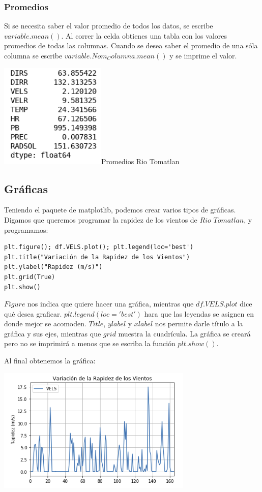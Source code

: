 \documentclass{article}
\begin{document}
\subsubsection{Promedios}
Si se necesita saber el valor promedio de todos los datos, se escribe $variable.mean()$. Al correr la celda obtienes una tabla con los valores promedios de todas las columnas. Cuando se desea saber el promedio de una sóla columna se escribe $variable.Nom_Columna.mean()$ y se imprime el valor.
   
   \begin{center}
   \includegraphics[height=5cm]{promedios.png}{Promedios Rio Tomatlan} 
   \end{center}
   
\subsection{Gráficas}
Teniendo el paquete de matplotlib, podemos crear varios tipos de gráficas. Digamos que queremos programar la rapidez de los vientos de $Rio$ $Tomatlan$, y programamos:

\begin{verbatim}plt.figure(); df.VELS.plot(); plt.legend(loc='best')
plt.title("Variación de la Rapidez de los Vientos")
plt.ylabel("Rapidez (m/s)")
plt.grid(True)
plt.show()
\end{verbatim}

	$Figure$ nos indica que quiere hacer una gráfica, mientras que $df.VELS.plot$ dice qué desea graficar. $plt.legend(loc='best')$ hara que las leyendas se asignen en donde mejor se acomoden. $Title$, $ylabel$ y $xlabel$ nos permite darle título a la gráfica y sus ejes, mientras que $grid$ muestra la cuadrícula. La gráfica se creará pero no se imprimirá a menos que se escriba la función $plt.show()$.
    
    Al final obtenemos la gráfica:
    
   \begin{center}
   \includegraphics[height=6cm]{grafica_de_los_vientos.png}
   \end{center}
\end{document}
